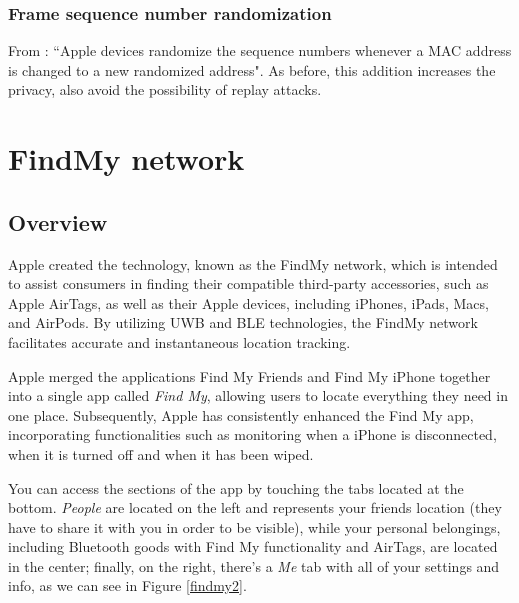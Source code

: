 \documentclass[english]{article}
\begin{document}
\subsubsection{Frame sequence number randomization}
From \cite{aps}: ``Apple devices randomize the sequence numbers whenever a MAC address is changed to a new randomized address". As before, this addition increases the privacy, also avoid the possibility of replay attacks.

\section{FindMy network}\label{sec:find}
\subsection{Overview}
Apple created the technology, known as the FindMy network, which is intended to assist consumers in finding their compatible third-party accessories, such as Apple AirTags, as well as their Apple devices, including iPhones, iPads, Macs, and AirPods. By utilizing UWB and BLE technologies, the FindMy network facilitates accurate and instantaneous location tracking.

Apple merged the applications Find My Friends and Find My iPhone together into a single app called \textit{Find My}, allowing users to locate everything they need in one place. Subsequently, Apple has consistently enhanced the Find My app, incorporating functionalities such as monitoring when a iPhone is disconnected, when it is turned off and when it has been wiped.

You can access the sections of the app by touching the tabs located at the bottom. \textit{People} are located on the left and represents your friends location (they have to share it with you in order to be visible), while your personal belongings, including Bluetooth goods with Find My functionality and AirTags, are located in the center; finally, on the right, there's a \textit{Me} tab with all of your settings and info, as we can see in Figure \ref{findmy2}.
\end{document}
